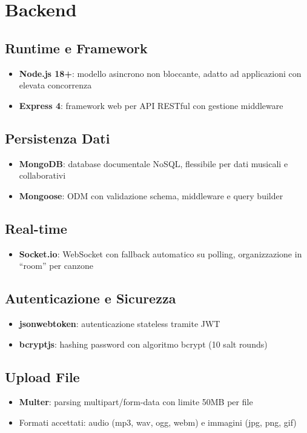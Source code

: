 \documentclass{report}
\begin{document}
\section{Backend}

\subsection{Runtime e Framework}
\begin{itemize}
    \item \textbf{Node.js 18+}: modello asincrono non bloccante, adatto ad applicazioni con elevata concorrenza
    \item \textbf{Express 4}: framework web per API RESTful con gestione middleware
\end{itemize}

\subsection{Persistenza Dati}
\begin{itemize}
    \item \textbf{MongoDB}: database documentale NoSQL, flessibile per dati musicali e collaborativi
    \item \textbf{Mongoose}: ODM con validazione schema, middleware e query builder
\end{itemize}

\subsection{Real-time}
\begin{itemize}
    \item \textbf{Socket.io}: WebSocket con fallback automatico su polling, organizzazione in ``room'' per canzone
\end{itemize}

\subsection{Autenticazione e Sicurezza}
\begin{itemize}
    \item \textbf{jsonwebtoken}: autenticazione stateless tramite JWT
    \item \textbf{bcryptjs}: hashing password con algoritmo bcrypt (10 salt rounds)
\end{itemize}

\subsection{Upload File}
\begin{itemize}
    \item \textbf{Multer}: parsing multipart/form-data con limite 50MB per file
    \item Formati accettati: audio (mp3, wav, ogg, webm) e immagini (jpg, png, gif)
\end{itemize}
\end{document}
